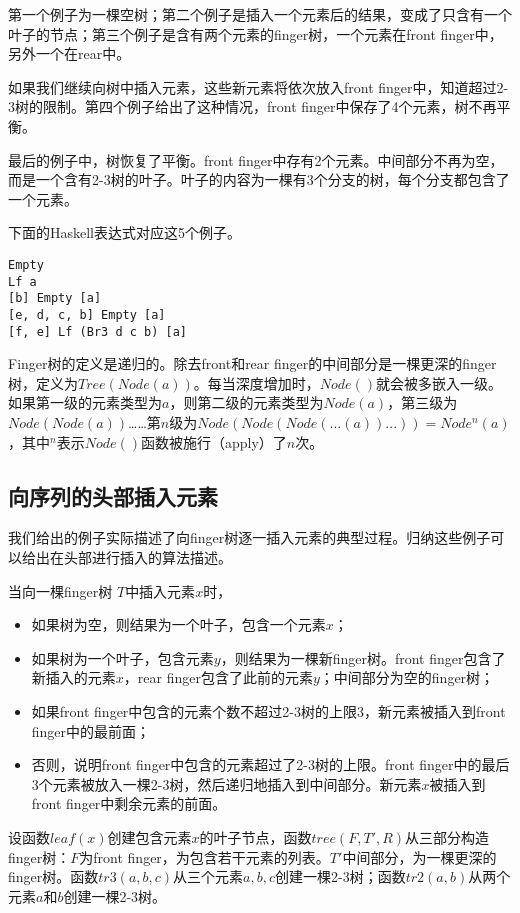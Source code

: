 \documentclass[UTF8]{article}
\begin{document}
第一个例子为一棵空树；第二个例子是插入一个元素后的结果，变成了只含有一个叶子的节点；第三个例子是含有两个元素的finger树，一个元素在front finger中，另外一个在rear中。

如果我们继续向树中插入元素，这些新元素将依次放入front finger中，知道超过2-3树的限制。第四个例子给出了这种情况，front finger中保存了4个元素，树不再平衡。

最后的例子中，树恢复了平衡。front finger中存有2个元素。中间部分不再为空，而是一个含有2-3树的叶子。叶子的内容为一棵有3个分支的树，每个分支都包含了一个元素。

下面的Haskell表达式对应这5个例子。

\lstset{language=Haskell}
\begin{lstlisting}
Empty
Lf a
[b] Empty [a]
[e, d, c, b] Empty [a]
[f, e] Lf (Br3 d c b) [a]
\end{lstlisting}

Finger树的定义是递归的。除去front和rear finger的中间部分是一棵更深的finger树，定义为$Tree(Node(a))$。每当深度增加时，$Node()$就会被多嵌入一级。如果第一级的元素类型为$a$，则第二级的元素类型为$Node(a)$，第三级为$Node(Node(a))$……第$n$级为$Node(Node(Node(...(a))...)) = Node^n(a)$，其中$^n$表示$Node()$函数被施行（apply）了$n$次。

\subsection{向序列的头部插入元素}

我们给出的例子实际描述了向finger树逐一插入元素的典型过程。归纳这些例子可以给出在头部进行插入的算法描述。

当向一棵finger树 $T$中插入元素$x$时，
\begin{itemize}
\item 如果树为空，则结果为一个叶子，包含一个元素$x$；
\item 如果树为一个叶子，包含元素$y$，则结果为一棵新finger树。front finger包含了新插入的元素$x$，rear finger包含了此前的元素$y$；中间部分为空的finger树；
\item 如果front finger中包含的元素个数不超过2-3树的上限3，新元素被插入到front finger中的最前面；
\item 否则，说明front finger中包含的元素超过了2-3树的上限。front finger中的最后3个元素被放入一棵2-3树，然后递归地插入到中间部分。新元素$x$被插入到front finger中剩余元素的前面。
\end{itemize}

设函数$leaf(x)$创建包含元素$x$的叶子节点，函数$tree(F, T', R)$从三部分构造finger树：$F$为front finger，为包含若干元素的列表。$T'$中间部分，为一棵更深的finger树。函数$tr3(a, b, c)$从三个元素$a, b, c$创建一棵2-3树；函数$tr2(a, b)$从两个元素$a$和$b$创建一棵2-3树。
\end{document}
